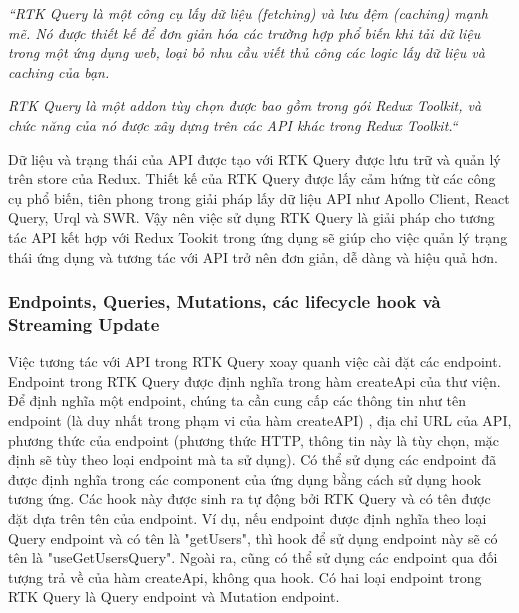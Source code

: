 \textit{“RTK Query là một công cụ lấy dữ liệu (fetching) và lưu đệm (caching) mạnh mẽ.
  Nó được thiết kế để đơn giản hóa các trường hợp phổ biến khi tải dữ liệu trong một ứng dụng web, loại bỏ nhu cầu viết thủ công các logic lấy dữ liệu và caching của bạn.}
\par

\textit{RTK Query là một addon tùy chọn được bao gồm trong gói Redux Toolkit, và chức năng của nó được xây dựng trên các API khác trong Redux Toolkit.“} \cite{chap4bib2}
\par

Dữ liệu và trạng thái của API được tạo với RTK Query được lưu trữ và quản lý trên store của Redux.
Thiết kế của RTK Query được lấy cảm hứng từ các công cụ phổ biến, tiên phong trong giải pháp lấy dữ liệu API như Apollo Client, React Query, Urql và SWR.
Vậy nên việc sử dụng RTK Query là giải pháp cho tương tác API kết hợp với Redux Tookit trong ứng dụng sẽ giúp cho việc quản lý trạng thái ứng dụng và tương tác với API trở nên đơn giản, dễ dàng và hiệu quả hơn.

\subsubsection{Endpoints, Queries, Mutations, các lifecycle hook và Streaming Update}

\tab Việc tương tác với API trong RTK Query xoay quanh việc cài đặt các endpoint.
Endpoint trong RTK Query được định nghĩa trong hàm createApi của thư viện.
Để định nghĩa một endpoint, chúng ta cần cung cấp các thông tin như tên endpoint (là duy nhất trong phạm vi của hàm createAPI) , địa chỉ URL của API, phương thức của endpoint (phương thức HTTP, thông tin này là tùy chọn, mặc định sẽ tùy theo loại endpoint mà ta sử dụng).
Có thể sử dụng các endpoint đã được định nghĩa trong các component của ứng dụng bằng cách sử dụng hook tương ứng.
Các hook này được sinh ra tự động bởi RTK Query và có tên được đặt dựa trên tên của endpoint.
Ví dụ, nếu endpoint được định nghĩa theo loại Query endpoint và có tên là "getUsers", thì hook để sử dụng endpoint này sẽ có tên là "useGetUsersQuery".
Ngoài ra, cũng có thể sử dụng các endpoint  qua đối tượng trả về của hàm createApi, không qua hook.
Có hai loại endpoint trong RTK Query là Query endpoint và Mutation endpoint.

